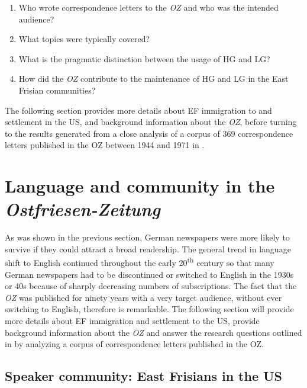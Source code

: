 \documentclass[output=paper]{langsci/langscibook}
\begin{document}
\begin{enumerate}
\item Who wrote correspondence letters to the \textit{OZ} and who was the intended audience?
 
\item What topics were typically covered?
 
\item  What is the pragmatic distinction between the usage of HG and LG?
 
\item How did the \textit{OZ} contribute to the maintenance of HG and LG in the East Frisian communities? 
%
\end{enumerate}
 
  

The following section provides more details about EF immigration to and settlement in the US, and background information about the \textit{OZ}, before turning to the results generated from a close analysis of a corpus of 369 correspondence letters published in the OZ between 1944 and 1971 in .


\section{Language and community in the \textit{Ostfriesen-Zeitung}}
\label{sec:rocker:3}


As was shown in the previous section, German newspapers were more likely to survive if they could attract a broad readership. The general trend in language shift to English continued throughout the early 20\textsuperscript{th} century so that many German newspapers had to be discontinued or switched to English in the 1930s or 40s because of sharply decreasing numbers of subscriptions. The fact that the \textit{OZ} was published for ninety years with a very target audience, without ever switching to English, therefore is remarkable. The following section will provide more details about EF immigration and settlement to the US, provide background information about the \textit{OZ} and answer the research questions outlined in  by analyzing a corpus of correspondence letters published in the OZ.

\subsection{Speaker community: East Frisians in the US} %
\label{sec:rocker:3.1}
\end{document}
